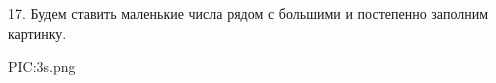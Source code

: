 17. Будем ставить маленькие числа рядом с большими и постепенно заполним картинку.
\begin{center}
{{PIC:3s.png}}
\end{center}
